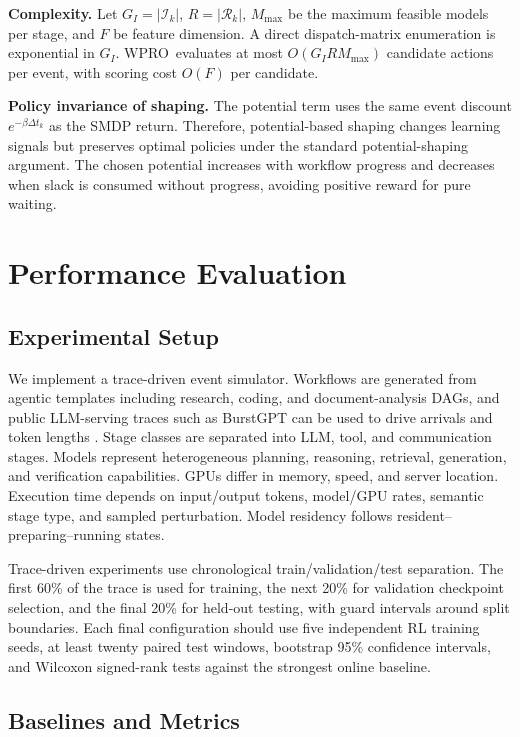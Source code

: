 \documentclass[10pt,conference]{IEEEtran}
\newcommand{\WPRO}{\textsc{WPRO}}
\newcommand{\calR}{\mathcal{R}}
\newcommand{\calI}{\mathcal{I}}
\begin{document}
\textbf{Complexity.}
Let \(G_I=|\calI_k|\), \(R=|\calR_k|\), \(M_{\max}\) be the maximum feasible models per stage, and \(F\) be feature dimension. A direct dispatch-matrix enumeration is exponential in \(G_I\). \WPRO\ evaluates at most \(O(G_I R M_{\max})\) candidate actions per event, with scoring cost \(O(F)\) per candidate.

\textbf{Policy invariance of shaping.}
The potential term uses the same event discount \(e^{-\beta\Delta t_k}\) as the SMDP return. Therefore, potential-based shaping changes learning signals but preserves optimal policies under the standard potential-shaping argument. The chosen potential increases with workflow progress and decreases when slack is consumed without progress, avoiding positive reward for pure waiting.

\section{Performance Evaluation}

\subsection{Experimental Setup}

We implement a trace-driven event simulator. Workflows are generated from agentic templates including research, coding, and document-analysis DAGs, and public LLM-serving traces such as BurstGPT can be used to drive arrivals and token lengths \cite{wang2024burstgpt}. Stage classes are separated into LLM, tool, and communication stages. Models represent heterogeneous planning, reasoning, retrieval, generation, and verification capabilities. GPUs differ in memory, speed, and server location. Execution time depends on input/output tokens, model/GPU rates, semantic stage type, and sampled perturbation. Model residency follows resident--preparing--running states.

Trace-driven experiments use chronological train/validation/test separation. The first 60\% of the trace is used for training, the next 20\% for validation checkpoint selection, and the final 20\% for held-out testing, with guard intervals around split boundaries. Each final configuration should use five independent RL training seeds, at least twenty paired test windows, bootstrap 95\% confidence intervals, and Wilcoxon signed-rank tests against the strongest online baseline.

\subsection{Baselines and Metrics}
\end{document}
